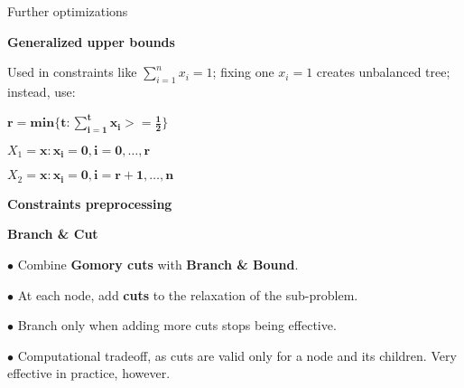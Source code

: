 \documentclass[13pt]{beamer}
\begin{document}
\begin{frame}{Further optimizations}
    \begin{fullpageitemize}
         \item<1->[\rtarrow]\textbf{Generalized upper bounds}
         \begin{baseitemize}
             \item<2->Used in constraints like $\sum_{i=1}^n{x_i}=1$; fixing one $x_i = 1$ creates unbalanced tree; instead, use:
             \item<3->$\mathbf{r = min\{t: \sum_{i=1}^t{x_i} >= \frac{1}{2}\}}$
             \item<3->$X_1 = \mathbf{x: x_i = 0,  i=0,\ldots, r}$
             \item<3->$X_2 = \mathbf{x: x_i = 0,  i=r+1,\ldots, n}$
         \end{baseitemize}	
         \item<4->[\rtarrow]\textbf{Constraints preprocessing}
         \item<5->[\rtarrow]\textbf{Branch \& Cut}
         \begin{baseitemize}
             \item<6->$\bullet$ Combine \textbf{Gomory cuts} with \textbf{Branch \& Bound}.
             \item<7->$\bullet$ At each node, add \textbf{cuts} to the relaxation of the sub-problem.
             \item<8->$\bullet$ Branch only when adding more cuts stops being effective.
             \item<9->$\bullet$ Computational tradeoff, as cuts are valid only for a node and its children. Very effective in practice, however.
         \end{baseitemize}
     \end{fullpageitemize}
 \end{frame}      
\end{document}
